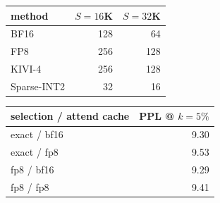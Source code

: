 \begin{tabular}{l r r}
\toprule
method & $S{=}16$K & $S{=}32$K \\
\midrule
BF16 & 128 & 64 \\
FP8 & 256 & 128 \\
KIVI-4 & 256 & 128 \\
Sparse-INT2 & 32 & 16 \\
\bottomrule
\end{tabular}
\hspace{1.4cm}
\begin{tabular}{l r}
\toprule
selection / attend cache & PPL @ $k{=}5\%$ \\
\midrule
exact / bf16 & 9.30 \\
exact / fp8 & 9.53 \\
fp8 / bf16 & 9.29 \\
fp8 / fp8 & 9.41 \\
\bottomrule
\end{tabular}
